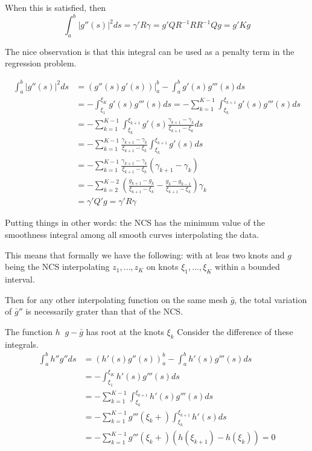 \documentclass[a4paper]{article}
\newcommand{\clo}[1]{{\left [ #1 \right ]}}
\newcommand{\brac}[1]{{\left ( #1 \right )}}
\newcommand{\induc}[1]{{\left . #1 \right \vert}}
\newcommand{\abs}[1]{{\left | #1 \right |}}
\newcommand{\defn}{\mathop{\overset{\Delta}{=}}\nolimits}
\begin{document}
When this is satisfied, then 
\[\int_a^b \abs{g''(s)}^2 ds = \gamma' R \gamma = g' Q R^{-1} R R^{-1} Q g = g' K g\]

The nice observation is that this integral can be used as a penalty term in the regression problem.

\begin{align*}
	\int_a^b \abs{g''(s)}^2 ds &= \induc{\brac{g''(s)g'(s)}}_a^b - \int_a^b g'(s) g'''(s) ds \\
	&= - \int_{\xi_1}^{\xi_K} g'(s) g'''(s) ds = - \sum_{k=1}^{K-1} \int_{\xi_k}^{\xi_{k+1}} g'(s) g'''(s) ds\\
	&= - \sum_{k=1}^{K-1} \int_{\xi_k}^{\xi_{k+1}} g'(s) \frac{\gamma_{k+1}-\gamma_k}{\xi_{k+1}-\xi_k} ds\\
	&= - \sum_{k=1}^{K-1} \frac{\gamma_{k+1}-\gamma_k}{\xi_{k+1}-\xi_k} \int_{\xi_k}^{\xi_{k+1}} g'(s) ds\\
	&= - \sum_{k=1}^{K-1} \frac{\gamma_{k+1}-\gamma_k}{\xi_{k+1}-\xi_k} \brac{\gamma_{k+1}-\gamma_k}\\
	&= - \sum_{k=2}^{K-2} \brac{\frac{g_{k+1}-g_k}{\xi_{k+1}-\xi_k} - \frac{g_k-g_{k-1}}{\xi_{k+1}-\xi_k}} \gamma_k \\
	& = \gamma' Q' g = \gamma' R \gamma
\end{align*}

Putting things in other words:
the NCS has the minimum value of the smoothness integral among all smooth curves interpolating the data.

This means that formally we have the following:
with at leas two knots and $g$ being the NCS interpolating $z_1,\ldots,z_K$ on knots $\xi_1,\ldots,\xi_K$ within a bounded interval.

Then for any other interpolating function on the same mesh $\bar{g}$, the total variation of $\bar{g}''$ is necessarily grater than that of the NCS.


The function $h \defn g - \bar{g}$ has root at the knots $\xi_k$
Consider the difference of these integrals. 
\begin{align*}
	\int_a^b h'' g'' ds
	& = \brac{h'(s)g''(s)}_a^b - \int_a^b h'(s) g'''(s) ds \\
	& = - \int_{\xi_1}^{\xi_K} h'(s) g'''(s) ds \\
	& = - \sum_{k=1}^{K-1} \int_{\xi_k}^{\xi_{k+1}} h'(s) g'''(s) ds \\
	& = - \sum_{k=1}^{K-1}  g'''(\xi_k+) \int_{\xi_k}^{\xi_{k+1}} h'(s) ds \\
	& = - \sum_{k=1}^{K-1}  g'''(\xi_k+) \brac{h(\xi_{k+1})-h(\xi_k)} = 0
\end{align*}
\end{document}
